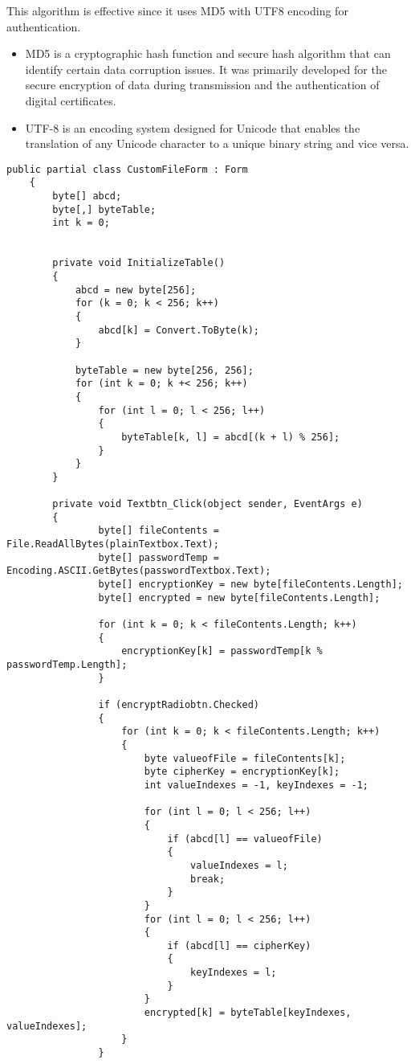 This algorithm is effective since it uses MD5 with UTF8 encoding for authentication. 
\begin{itemize}
    \item MD5 is a cryptographic hash function and secure hash algorithm that can identify certain data corruption issues. It was primarily developed for the secure encryption of data during transmission and the authentication of digital certificates.
    \item UTF-8 is an encoding system designed for Unicode that enables the translation of any Unicode character to a unique binary string and vice versa.
\end{itemize}


\begin{lstlisting}[caption=B\&G Cipher File Source Code]
    public partial class CustomFileForm : Form
    {
        byte[] abcd;
        byte[,] byteTable;
        int k = 0;


        private void InitializeTable()
        {
            abcd = new byte[256];
            for (k = 0; k < 256; k++)
            {
                abcd[k] = Convert.ToByte(k);
            }

            byteTable = new byte[256, 256];
            for (int k = 0; k +< 256; k++)
            {
                for (int l = 0; l < 256; l++)
                {
                    byteTable[k, l] = abcd[(k + l) % 256];
                }
            }
        }
        
        private void Textbtn_Click(object sender, EventArgs e)
        {
                byte[] fileContents = File.ReadAllBytes(plainTextbox.Text);
                byte[] passwordTemp = Encoding.ASCII.GetBytes(passwordTextbox.Text);
                byte[] encryptionKey = new byte[fileContents.Length];
                byte[] encrypted = new byte[fileContents.Length];

                for (int k = 0; k < fileContents.Length; k++)
                {
                    encryptionKey[k] = passwordTemp[k % passwordTemp.Length];
                }
                
                if (encryptRadiobtn.Checked)
                {
                    for (int k = 0; k < fileContents.Length; k++)
                    {
                        byte valueofFile = fileContents[k];
                        byte cipherKey = encryptionKey[k];
                        int valueIndexes = -1, keyIndexes = -1;

                        for (int l = 0; l < 256; l++)
                        {
                            if (abcd[l] == valueofFile)
                            {
                                valueIndexes = l;
                                break;
                            }
                        }
                        for (int l = 0; l < 256; l++)
                        {
                            if (abcd[l] == cipherKey)
                            {
                                keyIndexes = l;
                            }
                        }
                        encrypted[k] = byteTable[keyIndexes, valueIndexes];
                    }
                }


\end{lstlisting}

